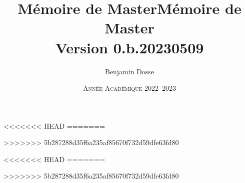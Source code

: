 \documentclass[a4paper, 11pt]{book}
\title{Mémoire de Master}\let\thetitle\@title
\title{Mémoire de Master\\Version 0.b.20230509}\let\thetitle\@title
\date{\textsc{Année Académique 2022--2023}}\let\thedate\@date
\author{Benjamin Dosse}\let\theauthor\@author
\begin{document}
\frontmatter
% 
\maketitle
<<<<<<< HEAD
=======

>>>>>>> 5b287288d35f6a235af85670f732d59dfe63fd80
\printnomenclature
\tableofcontents

\mainmatter

<<<<<<< HEAD
=======



>>>>>>> 5b287288d35f6a235af85670f732d59dfe63fd80

\nocite{*}
\printbibliography[heading=bibintoc]
\end{document}

